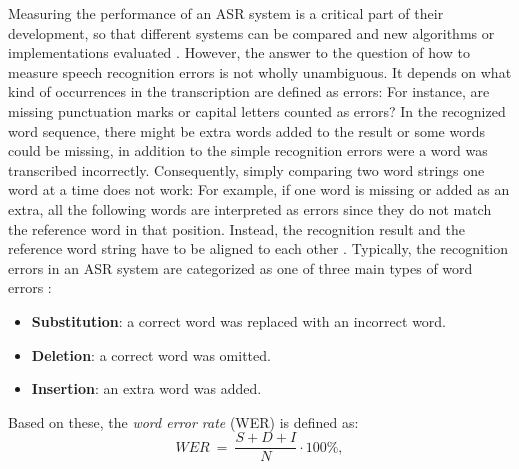 \documentclass[english, 12pt, a4paper, pdftex, elec, utf8]{aaltothesis}
\begin{document}
Measuring the performance of an ASR system is a critical part of their development, so that different systems can be compared and new algorithms or implementations evaluated \cite{huang2001spoken}. However, the answer to the question of how to measure speech recognition errors is not wholly unambiguous. It depends on what kind of occurrences in the transcription are defined as errors: For instance, are missing punctuation marks or capital letters counted as errors? In the recognized word sequence, there might be extra words added to the result or some words could be missing, in addition to the simple recognition errors were a word was transcribed incorrectly. Consequently, simply comparing two word strings one word at a time does not work: For example, if one word is missing or added as an extra, all the following words are interpreted as errors since they do not match the reference word in that position. Instead, the recognition result and the reference word string have to be aligned to each other \cite{huang2001spoken}. Typically, the recognition errors in an ASR system are categorized as one of three main types of word errors \cite[p.~420]{huang2001spoken}:
\vspace{2mm}
\begin{itemize}[itemsep=2mm]
	\item \textbf{Substitution}: a correct word was replaced with an incorrect word.
	\item \textbf{Deletion}: a correct word was omitted.
	\item \textbf{Insertion}: an extra word was added.
\end{itemize} 
\vspace{2mm}
Based on these, the \textit{word error rate} (WER) is defined as:
\begin{equation}
WER \ = \ \frac{S + D + I}{N} \cdot 100\%,
\end{equation}
\end{document}
